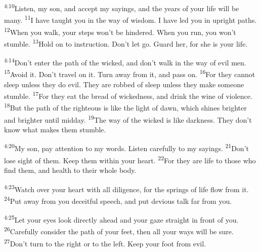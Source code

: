 \documentclass[openany,12pt,english]{book}
\newenvironment{para}{\par\pretolerance=100\tolerance=200\setlength{\emergencystretch}{0.6em}\relax}{\par}
\begin{document}
\begin{para}
    \textsuperscript{4:10}\thinspace{}Lis\-ten, my son, and ac\-cept my sayings, and the years of your life will be man\-y.
    \textsuperscript{11}\thinspace{}I have taught you in the way of wis\-dom. I have led you in up\-right paths.
    \textsuperscript{12}\thinspace{}When you walk, your steps won't be hindered. When you run, you won't stum\-ble.
    \textsuperscript{13}\thinspace{}Hold on to in\-struc\-tion. Don't let go. Guard her, for she is your life.
\end{para}

\begin{para}
    \textsuperscript{4:14}\thinspace{}Don't en\-ter the path of the wick\-ed, and don't walk in the way of evil men.
    \textsuperscript{15}\thinspace{}A\-void it. Don't trav\-el on it. Turn a\-way from it, and pass on.
    \textsuperscript{16}\thinspace{}For they can\-not sleep un\-less they do evil. They are robbed of sleep un\-less they make some\-one stum\-ble.
    \textsuperscript{17}\thinspace{}For they eat the bread of wick\-ed\-ness, and drink the wine of vi\-o\-lence.
    \textsuperscript{18}\thinspace{}But the path of the right\-eous is like the light of dawn, which shines brighter and brighter un\-til mid\-day.
    \textsuperscript{19}\thinspace{}The way of the wick\-ed is like dark\-ness. They don't know what makes them stum\-ble.
\end{para}

\begin{para}
    \textsuperscript{4:20}\thinspace{}My son, pay at\-ten\-tion to my words. Lis\-ten care\-ful\-ly to my sayings.
    \textsuperscript{21}\thinspace{}Don't lose sight of them. Keep them with\-in your heart.
    \textsuperscript{22}\thinspace{}For they are life to those who find them, and health to their whole bod\-y.
\end{para}

\begin{para}
    \textsuperscript{4:23}\thinspace{}Watch o\-ver your heart with all dil\-i\-gence, for the springs of life flow from it.
    \textsuperscript{24}\thinspace{}Put a\-way from you de\-ceit\-ful speech, and put de\-vi\-ous talk far from you.
\end{para}

\begin{para}
    \textsuperscript{4:25}\thinspace{}Let your eyes look di\-rect\-ly a\-head and your gaze straight in front of you.
    \textsuperscript{26}\thinspace{}Care\-ful\-ly con\-sid\-er the path of your feet, then all your ways will be sure.
    \textsuperscript{27}\thinspace{}Don't turn to the right or to the left. Keep your foot from evil.
\end{para}
\end{document}
